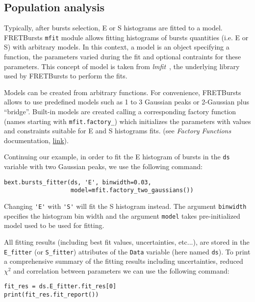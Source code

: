 \subsection{Population analysis}
\label{sec:fretfit}

Typically, after bursts selection, E or S histograms are fitted to a model.
FRETBursts \verb|mfit| module allows fitting histograms of bursts quantities
(i.e. E or S) with arbitrary models. In this context, a model is an object 
specifying a function, the parameters varied during the fit
and optional contraints for these parameters. This concept of model
is taken from \textit{lmfit}~\cite{lmfit}, the underlying library used by
FRETBursts to perform the fits.

Models can be created from arbitrary functions. For convenience,
FRETBursts allows to use predefined models such as 1 to 3 Gaussian
peaks or 2-Gaussian plus ``bridge''.
Built-in models are created calling a corresponding factory function
(names starting with \verb|mfit.factory_|) which initializes the parameters
with values and constraints suitable for E and S histograms fits.
(see \textit{Factory Functions} documentation, 
\href{http://fretbursts.readthedocs.org/en/latest/mfit.html#model-factory-functions}{link}).

Continuing our example, in order to fit the E histogram of bursts in the
\verb|ds| variable with two Gaussian peaks, we use the following command:

\begin{lstlisting}
bext.bursts_fitter(ds, 'E', binwidth=0.03,
                   model=mfit.factory_two_gaussians())
\end{lstlisting}

Changing \verb|'E'| with \verb|'S'| will fit the S histogram instead.
The argument \verb|binwidth| specifies the histogram bin width and 
the argument \verb|model| takes pre-initialized model used to be used for
fitting. 

All fitting results (including best fit values, uncertainties, etc...), 
are stored in the \verb|E_fitter| (or \verb|S_fitter|)
attributes of the \verb|Data| variable (here named \verb|ds|).
To print a comprehensive summary of the fitting results including
uncertainties, reduced $\chi^2$ and correlation between parameters
we can use the following command:

\begin{lstlisting}
fit_res = ds.E_fitter.fit_res[0]
print(fit_res.fit_report())
\end{lstlisting}

